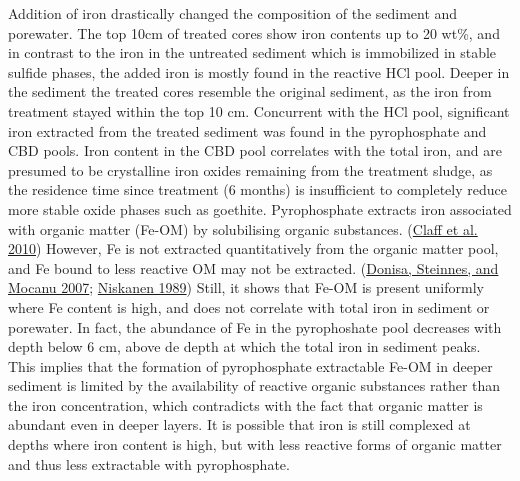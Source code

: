 \documentclass[a4paper,11pt]{article}
\begin{document}
Addition of iron drastically changed the composition of the sediment and porewater. The top 10cm of treated cores show iron contents up to 20 wt\%, and in contrast to the iron in the untreated sediment which is immobilized in stable sulfide phases, the added iron is mostly found in the reactive HCl pool. Deeper in the sediment the treated cores resemble the original sediment, as the iron from treatment stayed within the top 10 cm. Concurrent with the HCl pool, significant iron extracted from the treated sediment was found in the pyrophosphate and CBD pools. Iron content in the CBD pool correlates with the total iron, and are presumed to be crystalline iron oxides remaining from the treatment sludge, as the residence time since treatment (6 months) is insufficient to completely reduce more stable oxide phases such as goethite. Pyrophosphate extracts iron associated with organic matter (Fe-OM) by solubilising organic substances. (\protect\hyperlink{ref-claffSequentialExtractionProcedure2010}{Claff et al. 2010}) However, Fe is not extracted quantitatively from the organic matter pool, and Fe bound to less reactive OM may not be extracted. (\protect\hyperlink{ref-donisaCombinationDifferentExtractants2007}{Donisa, Steinnes, and Mocanu 2007}; \protect\hyperlink{ref-niskanenExtractableAluminiumIron1989}{Niskanen 1989}) Still, it shows that Fe-OM is present uniformly where Fe content is high, and does not correlate with total iron in sediment or porewater. In fact, the abundance of Fe in the pyrophoshate pool decreases with depth below 6 cm, above de depth at which the total iron in sediment peaks. This implies that the formation of pyrophosphate extractable Fe-OM in deeper sediment is limited by the availability of reactive organic substances rather than the iron concentration, which contradicts with the fact that organic matter is abundant even in deeper layers. It is possible that iron is still complexed at depths where iron content is high, but with less reactive forms of organic matter and thus less extractable with pyrophosphate.
\end{document}

